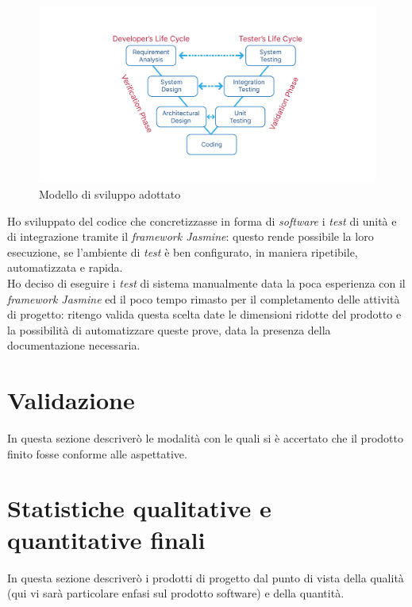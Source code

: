 \begin{figure}[H]
    \centering
    \includegraphics[width=\textwidth]{images/v-model.jpg}
    \caption[Modello di sviluppo del prodotto adottato]{Modello di sviluppo adottato\footnotemark}
\end{figure}

Ho sviluppato del codice che concretizzasse in forma di \textit{software} i \textit{test} di unità e di integrazione tramite il \textit{framework Jasmine}: questo rende possibile la loro esecuzione, se l'ambiente di \textit{test} è ben configurato, in maniera ripetibile, automatizzata e rapida. \\
Ho deciso di eseguire i \textit{test} di sistema manualmente data la poca esperienza con il \textit{framework Jasmine} ed il poco tempo rimasto per il completamento delle attività di progetto: ritengo valida questa scelta date le dimensioni ridotte del prodotto e la possibilità di automatizzare queste prove, data la presenza della documentazione necessaria.
\section{Validazione}

In questa sezione descriverò le modalità con le quali si è accertato che il prodotto finito fosse conforme alle aspettative.

\section{Statistiche qualitative e quantitative finali}

In questa sezione descriverò i prodotti di progetto dal punto di vista della qualità (qui vi sarà particolare enfasi sul prodotto software) e della quantità.